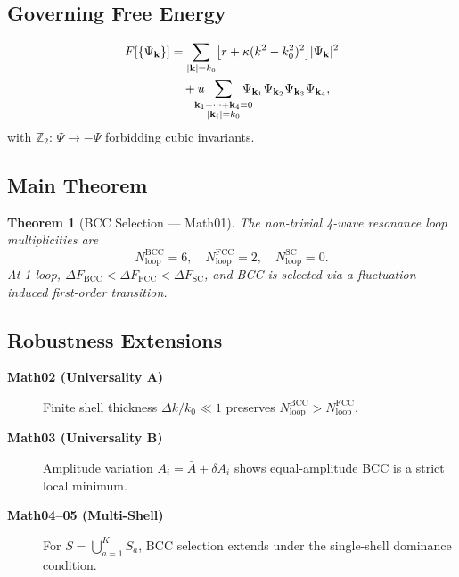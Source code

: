 \documentclass[11pt,a4paper]{article}
\newcommand{\Nloop}{N_{\mathrm{loop}}}
\newtheorem{theorem}{Theorem}[section]
\begin{document}
\subsection{Governing Free Energy}
\begin{align}
F[\{\Psi_{\mathbf{k}}\}]
&=\sum_{|\mathbf{k}|=k_{0}}\bigl[r+\kappa(k^{2}-k_{0}^{2})^{2}\bigr]|\Psi_{\mathbf{k}}|^{2}
\notag\\
&\quad+u\!\!\!\!\!\!\sum_{\substack{\mathbf{k}_{1}+\cdots+\mathbf{k}_{4}=0\\|\mathbf{k}_{i}|=k_{0}}}
\!\!\!\!\!\!\Psi_{\mathbf{k}_{1}}\Psi_{\mathbf{k}_{2}}\Psi_{\mathbf{k}_{3}}\Psi_{\mathbf{k}_{4}},
\label{eq:LB}
\end{align}
with $\mathbb{Z}_{2}$: $\Psi\to-\Psi$ forbidding cubic invariants.

\subsection{Main Theorem}
\begin{theorem}[BCC Selection --- Math01]
The non-trivial 4-wave resonance loop multiplicities are
\begin{equation}
\Nloop^{\mathrm{BCC}}=6,\quad
\Nloop^{\mathrm{FCC}}=2,\quad
\Nloop^{\mathrm{SC}}=0.
\label{eq:Nloop}
\end{equation}
At 1-loop, $\Delta F_{\mathrm{BCC}}<\Delta F_{\mathrm{FCC}}<\Delta F_{\mathrm{SC}}$,
and BCC is selected via a fluctuation-induced first-order transition.
\end{theorem}

\subsection{Robustness Extensions}
\begin{description}
\item[\textbf{Math02 (Universality A)}]
  Finite shell thickness $\Delta k/k_{0}\ll 1$ preserves
  $\Nloop^{\mathrm{BCC}}>\Nloop^{\mathrm{FCC}}$.

\item[\textbf{Math03 (Universality B)}]
  Amplitude variation $A_{i}=\bar{A}+\delta A_{i}$ shows equal-amplitude
  BCC is a strict local minimum.

\item[\textbf{Math04--05 (Multi-Shell)}]
  For $S=\bigcup_{a=1}^{K}S_{a}$, BCC selection extends under the
  single-shell dominance condition.
\end{description}
\end{document}
